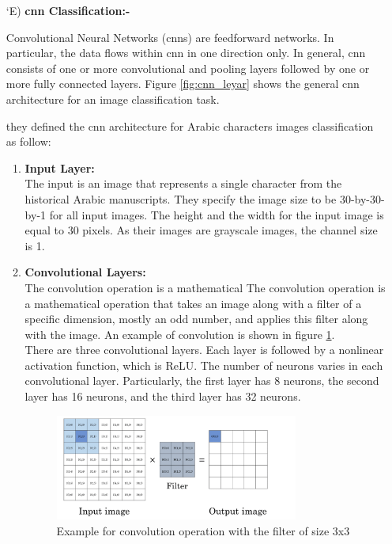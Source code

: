 \begin{itemize}[labelindent=1em,labelsep=0.25cm,leftmargin=*]
        
        \item[\char `E)] \textbf{\acrshort{cnn} Classification:-}
        
        Convolutional Neural Networks (\acrshort{cnn}s) are feedforward networks. In particular, the data flows within \acrshort{cnn} in one direction only. In general, \acrshort{cnn} consists of one or more convolutional and pooling layers followed by one or more fully connected layers. Figure \ref{fig:cnn_leyar} shows the general \acrshort{cnn} architecture for an image classification task.
        
        they defined the \acrshort{cnn} architecture for Arabic characters images classification as follow:
        \begin{enumerate}
        \item {\textbf{Input Layer:}}\\
       The input is an image that represents a single character from the historical Arabic manuscripts. They specify the image size to be 30-by-30-by-1 for all input images. The height and the width for the input image is equal to 30 pixels. As their images are grayscale images, the channel size is 1.
       
        \item {\textbf{Convolutional Layers:}}\\
        The convolution operation is a mathematical The convolution operation is a mathematical operation that takes an image along with a filter of a specific dimension, mostly an odd number, and applies this filter along with the image. An example of convolution is shown in figure \ref{fig:cnn-onvolution}. \\
        
        There are three convolutional layers. Each layer is followed by a
        nonlinear activation function, which is ReLU. The number of neurons varies in each convolutional layer. Particularly, the first layer has 8 neurons, the second layer has 16 neurons, and the third layer has 32 neurons.
        
        \begin{figure}[!htb]
        \centering
        \includegraphics[width=8cm]{images/cnn-convolution.png}
        \caption{Example for convolution operation with the filter of size 3x3}
        \label{fig:cnn-onvolution}
        \end{figure}
        

\end{enumerate}
\end{itemize}
